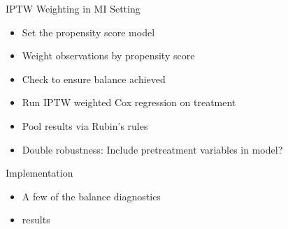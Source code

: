\begin{frame}{IPTW Weighting in MI Setting}
\begin{itemize}
 \item Set the propensity score model
 \item Weight observations by propensity score
 \item Check to ensure balance achieved
 \item Run IPTW weighted Cox regression on treatment
 \item Pool results via Rubin's rules
 \item Double robustness: Include pretreatment variables in model?
\end{itemize} 
\end{frame}

\begin{frame}{Implementation}
 \begin{itemize}
  \item A few of the balance diagnostics
  \item results
 \end{itemize}

\end{frame}

